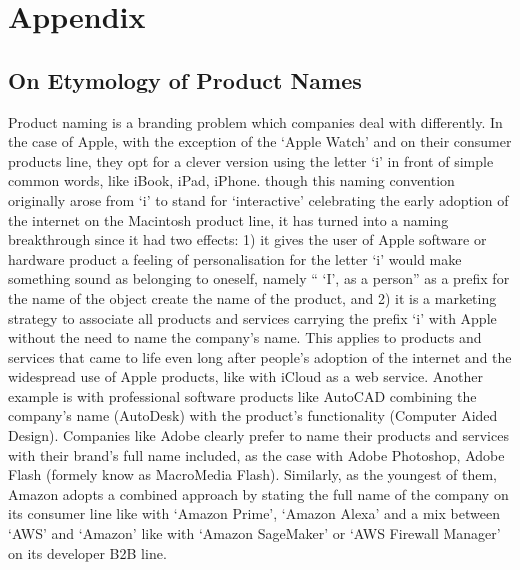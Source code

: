 \chapter*{Appendix} %
\label{appendices}


\section*{On Etymology of Product Names}
\label{etymology}

Product naming is a branding problem which companies deal with differently. In the case of Apple, with the exception of the `Apple Watch' and on their consumer products line, they opt for a clever version using the letter `i' in front of simple common words, like iBook, iPad, iPhone. though this naming convention originally arose from `i' to stand for `interactive' celebrating the early adoption of the internet on the Macintosh product line, it has turned into a naming breakthrough since it had two effects: 1) it gives the user of Apple software or hardware product a feeling of personalisation for the letter `i' would make something sound as belonging to oneself, namely `` `I', as a person'' as a prefix for the name of the object create the name of the product, and 2) it is a marketing strategy to associate all products and services carrying the prefix `i' with Apple without the need to name the company's name. This applies to products and services that came to life even long after people's adoption of the internet and the widespread use of Apple products, like with iCloud as a web service. Another example is with professional software products like AutoCAD combining the company's name (AutoDesk) with the product's functionality  (Computer Aided Design). Companies like Adobe clearly prefer to name their products and services with their brand's full name included, as the case with Adobe Photoshop, Adobe Flash (formely know as MacroMedia Flash). Similarly, as the youngest of them, Amazon adopts a combined approach by stating the full name of the company on its consumer line like with `Amazon Prime', `Amazon Alexa' and a mix between `AWS' and `Amazon' like with `Amazon SageMaker' or `AWS Firewall Manager' on its developer B2B line.  


